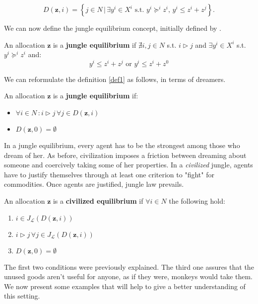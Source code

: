 \[ D(\textbf{z},i) = \left\{ j\in N\,|\,\exists y^i\in X^i \text{ s.t. } y^i\succeq^iz^i,\, y^i\leq z^i+z^j\right\}.\]

We can now define the jungle equilibrium concept, initially defined by \cite[PR]{P-R}.

\begin{definition}\label{def1}
    An allocation $\textbf{z}$ is a \textbf{jungle equilibrium} if $\nexists i,j\in N$ s.t. $i\triangleright j$ and $\exists y^i\in X^i$ s.t. $y^i\succeq^iz^i$ and:
    \[y^i\leq z^i+z^j\text{ or }y^i\leq z^i+z^0\]
\end{definition}

We can reformulate the definition \ref{def1} as follows, in terms of dreamers.

\begin{definition}\label{def2}
    An allocation $\textbf{z}$ is a \textbf{jungle equilibrium} if:
    \begin{itemize}
        \item $\forall i\in N\,:i\triangleright j\,\forall j\in D(\textbf{z},i)$
        \item $D(\textbf{z},0)=\emptyset$
    \end{itemize}
    
\end{definition}

In a jungle equilibrium, every agent has to be the strongest among those who dream of her. As before, civilization imposes a friction between dreaming about someone and coercively taking some of her properties. In a \textit{civilized} jungle, agents have to justify themselves through at least one criterion to "fight" for commodities. Once agents are justified, jungle law prevails.

\begin{definition}\label{Cequilibrium}
    An allocation $\textbf{z}$ is a \textbf{civilized equilibrium} if $\forall i\in N$ the following hold:
    \begin{enumerate}
        \item $i\in J_{\mathcal{L}}(D(\textbf{z},i))$
        \item $i\triangleright j\,\forall j\in J_{\mathcal{L}}(D(\textbf{z},i))$
        \item $D(\textbf{z},0)=\emptyset$
    \end{enumerate}
\end{definition}

The first two conditions were previously explained. The third one assures that the unused goods aren't useful for anyone, as if they were, monkeys would take them. We now present some examples that will help to give a better understanding of this setting.

